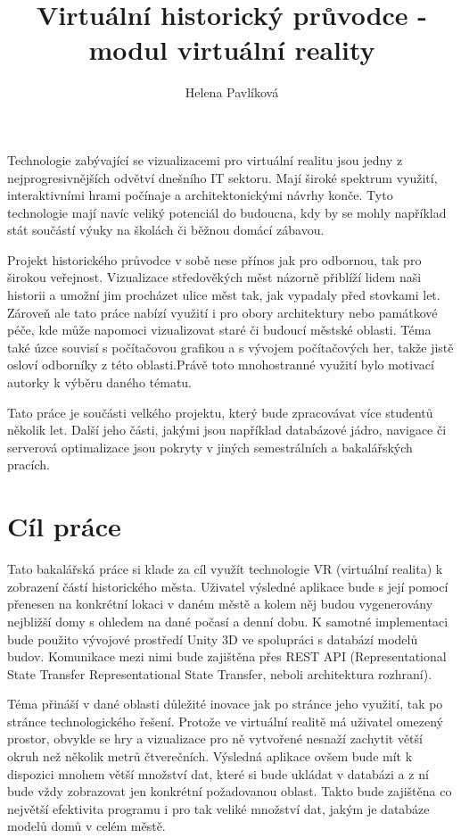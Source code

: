 \documentclass[thesis=B,czech]{FITthesis}[2012/06/26]
\title{Virtuální historický průvodce - modul virtuální reality}
\author{Helena Pavlíková} %
\begin{document}
\begin{introduction}
	Technologie zabývající se vizualizacemi pro virtuální realitu jsou jedny z nejprogresivnějších odvětví dnešního IT sektoru. Mají široké spektrum využití, interaktivními hrami počínaje a architektonickými návrhy konče. Tyto technologie mají navíc veliký potenciál do budoucna, kdy by se mohly například stát součástí výuky na školách či běžnou domácí zábavou.

    Projekt historického průvodce v sobě nese přínos jak pro odbornou, tak pro širokou veřejnost. Vizualizace středověkých měst názorně přiblíží lidem naši historii a umožní jim procházet ulice měst tak, jak vypadaly před stovkami let. Zároveň ale tato práce nabízí využití i pro obory architektury nebo památkové péče, kde může napomoci vizualizovat staré či budoucí městské oblasti. Téma také úzce souvisí s počítačovou grafikou a s vývojem počítačových her, takže jistě osloví odborníky z této oblasti.Právě toto mnohostranné využití bylo motivací autorky k výběru daného tématu.

    Tato práce je součásti velkého projektu, který bude zpracovávat více studentů několik let. Další jeho části, jakými jsou například databázové jádro, navigace či serverová optimalizace jsou pokryty v jiných semestrálních a bakalářských pracích.

\end{introduction}

\chapter{Cíl práce}

Tato bakalářská práce si klade za cíl využít technologie VR (virtuální realita) k zobrazení částí historického města. Uživatel výsledné aplikace bude s její pomocí přenesen na konkrétní lokaci v daném městě a kolem něj budou vygenerovány nejbližší domy s ohledem na dané počasí a denní dobu.  K samotné implementaci bude použito vývojové prostředí Unity 3D ve spolupráci s databází modelů budov. Komunikace mezi nimi bude zajištěna přes REST API (Representational State Transfer Representational State Transfer, neboli architektura rozhraní).
    
	Téma přináší v dané oblasti důležité inovace jak po stránce jeho využití, tak po stránce technologického řešení. Protože ve virtuální realitě má uživatel omezený prostor, obvykle se hry a vizualizace pro ně vytvořené nesnaží zachytit větší okruh než několik metrů čtverečních. Výsledná aplikace ovšem bude mít k dispozici mnohem větší množství dat, které si bude ukládat v databázi a z ní bude vždy zobrazovat jen konkrétní požadovanou oblast. Takto bude zajištěna co největší efektivita programu i pro tak veliké množství dat, jakým je databáze modelů domů v celém městě.
	
\end{document}
